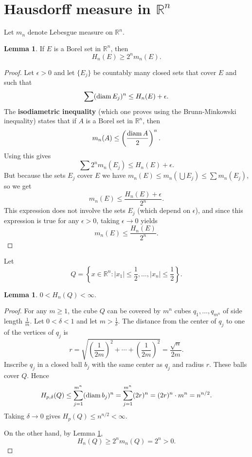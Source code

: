 \documentclass{article}
\newcommand{\diam}{\ensuremath\mathrm{diam}\,}
\theoremstyle{definition}
\newtheorem{lemma}[theorem]{Lemma}
\theoremstyle{definition}
\begin{document}
\section{Hausdorff measure in $\mathbb{R}^n$}
Let $m_n$ denote Lebesgue measure on $\mathbb{R}^n$. 

\begin{lemma}
If $E$ is a Borel set in $\mathbb{R}^n$, then
\[
H_n(E) \geq 2^n m_n(E).
\]
\label{Hnmn}
\end{lemma}
\begin{proof}
Let $\epsilon>0$ and let $\{E_j\}$ be countably many closed sets 
that cover $E$ and such that
\[
\sum (\diam E_j)^n \leq H_n(E)+\epsilon.
\]
The \textbf{isodiametric inequality} (which one proves using the Brunn-Minkowski inequality)
states that if $A$ is a Borel set in $\mathbb{R}^n$, then
\[
m_n(A) \leq \left( \frac{\diam A}{2} \right)^n.
\]
Using this gives
\[
\sum 2^n m_n(E_j) \leq H_n(E)+\epsilon.
\]
But
because the sets $E_j$ cover $E$ we have
$m_n(E) \leq m_n(\bigcup E_j) \leq \sum m_n(E_j)$, so we get
\[
m_n(E) \leq \frac{H_n(E)+\epsilon}{2^n}.
\]
This expression does not involve the sets $E_j$ (which depend on $\epsilon$), and since this expression is true for any
$\epsilon>0$, taking $\epsilon \to 0$ yields
\[
m_n(E) \leq \frac{H_n(E)}{2^n}.
\]
\end{proof}


Let
\[
Q=\left\{x \in \mathbb{R}^n: |x_1| \leq \frac{1}{2}, \ldots, |x_n| \leq \frac{1}{2}\right\}.
\]

\begin{lemma}
$0<H_n(Q)<\infty$.
\label{finitemeasure}
\end{lemma}
\begin{proof}
For any $m \geq 1$, the cube $Q$ can be covered by $m^n$ cubes $q_1,\ldots,q_{m^n}$ of side length $\frac{1}{m}$. 
Let $0<\delta<1$ and let $m>\frac{1}{\delta}$. 
The distance from the center of $q_j$ to one of the vertices of $q_j$ is 
\[
r = \sqrt{\left(\frac{1}{2m}\right)^2+\cdots+\left(\frac{1}{2m}\right)^2}
=\frac{\sqrt{n}}{2m}.
\]
Inscribe $q_j$ in a closed ball $b_j$ with the same center as $q_j$ and radius $r$. 
These balls cover $Q$. Hence
\[
H_{p,\delta}(Q) \leq 
\sum_{j=1}^{m^n} (\diam b_j)^n
=\sum_{j=1}^{m^n} (2r)^n
=(2r)^n \cdot m^n
=n^{n/2}.
\]
Taking $\delta \to 0$ gives $H_p(Q) \leq n^{n/2} < \infty$.

On the other hand, by Lemma \ref{Hnmn},
\[
H_n(Q) \geq 2^n m_n(Q) = 2^n>0.
\]
\end{proof}
\end{document}
